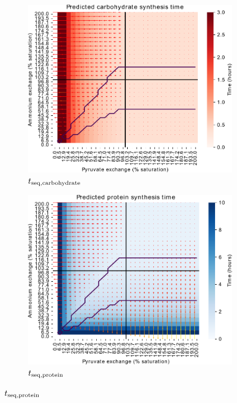 \begin{figure}
  \begin{subfigure}[t]{0.45\textwidth}
  \centering
    \includegraphics[width=\linewidth]{ec_grid_pyr_amm_carb}
    \caption{
      $t_{\mathrm{seq},\mathrm{carbohydrate}}$
    }
    \label{fig:model-grid-pyr-carb}
  \end{subfigure}%
  \begin{subfigure}[t]{0.45\textwidth}
  \centering
    \includegraphics[width=\linewidth]{ec_grid_pyr_amm_prot}
    \caption{
      $t_{\mathrm{seq},\mathrm{protein}}$
    }
    \label{fig:model-grid-pyr-prot}
  \end{subfigure}


\end{figure}
